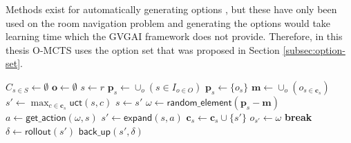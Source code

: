 Methods exist for automatically generating options \cite{castro2012automatic},
but these have only been used on the room navigation problem and generating the
options would take learning time which the GVGAI framework does not provide.
Therefore, in this thesis O-MCTS uses the option set that was proposed in
Section \ref{subsec:option-set}.

\begin{algorithm}[h]
	\caption{$\mathsf{O-MCTS}(O, r, t, d)$}
	\label{alg:omcts}
	\begin{algorithmic}[1]
		\State $C_{s \in S} \gets \emptyset$ 
		\State $\mathbf{o} \gets \emptyset$ 
		 \label{alg:omcts:mainloop}
			\State $s \gets r$ 
			 \label{alg:omcts:innerloop}
				 \label{alg:omcts:sp} 
					\State $\mathbf{p}_s \gets \cup_o (s \in I_{o \in O})$ 
				\Else
					\State $\mathbf{p}_s \gets \{o_s\}$ 
				\EndIf \label{alg:omcts:ep}
				\State $\mathbf{m} \gets \cup_o (o_{s \in \mathbf{c}_s})$  \label{alg:omcts:m}
				 
					\State $s' \gets \max_{c \in \mathbf{c}_s} \mathsf{uct}(s, c)$ \label{alg:omcts:uct} 
					\State $s \gets s'$ \label{alg:omcts:ss} 
				\Else \label{alg:omcts:sexpand}
					\State $\omega \gets \mathsf{random\_element}(\mathbf{p}_s - \mathbf{m})$ 
					\State $a \gets \mathsf{get\_action}(\omega, s)$ 
					\State $s' \gets \mathsf{expand}(s, a)$ 
						\State $\mathbf{c}_s \gets \mathbf{c}_s \cup \{s'\}$ 
					\State $o_{s'} \gets \omega$
					\State \textbf{break} \label{alg:omcts:break}
				\EndIf \label{alg:omcts:eexpand}
			\EndWhile
			\State $\delta \gets \mathsf{rollout}(s')$ \label{alg:omcts:rollout}
			\State $\mathsf{back\_up}(s', \delta)$ \label{alg:omcts:backup}
		\EndWhile
		\State {}
	\end{algorithmic}
\end{algorithm}

